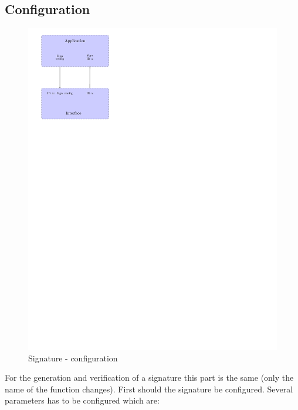\subsection*{Configuration}
\begin{figure}[!ht]
\centering
\includegraphics[trim=0cm 20cm 9.5cm 0cm]{figures/sign_example_config.pdf}
\caption{Signature - configuration\newline}
\label{fig:gci_sign_config}
\end{figure}
For the generation and verification of a signature this part is the same (only
the name of the function changes).\newline
First should the signature be configured.\newline
Several parameters has to be configured which are:
